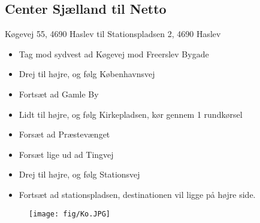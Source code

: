 \subsection{Center Sjælland til Netto}
Køgevej 55, 4690 Haslev til Stationspladsen 2, 4690 Haslev
\begin{itemize}
\item Tag mod sydvest ad Køgevej mod Freerslev Bygade
\item Drej til højre, og følg Københavnsvej
\item Fortsæt ad Gamle By
\item Lidt til højre, og følg Kirkepladsen, kør gennem 1 rundkørsel
\item Forsæt ad Præstevænget
\item Forsæt lige ud ad Tingvej
\item Drej til højre, og følg Stationsvej
\item Fortsæt ad stationspladsen, destinationen vil ligge på højre side.
\end{itemize}

\begin{figure}[H]
\begin{center}
\texttt{[image: fig/Ko.JPG]}
\end{center}
\end{figure}